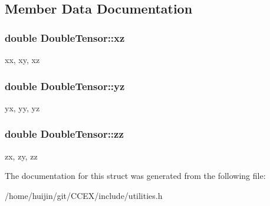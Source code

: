 \subsection{Member Data Documentation}
\hypertarget{structDoubleTensor_a78677cd002a23db74c7438a9e51aa264}{
\subsubsection[{xz}]{\setlength{\rightskip}{0pt plus 5cm}double Double\-Tensor\-::xz}}\label{structDoubleTensor_a78677cd002a23db74c7438a9e51aa264}
xx, xy, xz \hypertarget{structDoubleTensor_a0311ca5318233d1cd146c7f2ba0564a2}{
\subsubsection[{yz}]{\setlength{\rightskip}{0pt plus 5cm}double Double\-Tensor\-::yz}}\label{structDoubleTensor_a0311ca5318233d1cd146c7f2ba0564a2}
yx, yy, yz \hypertarget{structDoubleTensor_af3fec476b850d04a0f1e7a4cfbaceb2d}{
\subsubsection[{zz}]{\setlength{\rightskip}{0pt plus 5cm}double Double\-Tensor\-::zz}}\label{structDoubleTensor_af3fec476b850d04a0f1e7a4cfbaceb2d}
zx, zy, zz 

The documentation for this struct was generated from the following file\-:\begin{DoxyCompactItemize}
\item 
/home/huijin/git/\-C\-C\-E\-X/include/utilities.\-h\end{DoxyCompactItemize}
